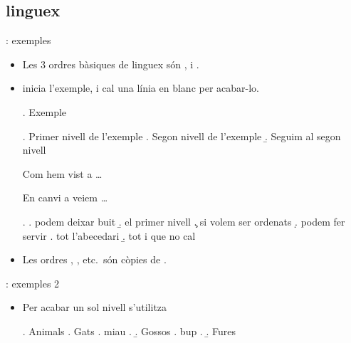 \subsection{linguex}
\begin{frame}[fragile]{\insertsubsection{}: exemples}
\begin{itemize}
\item Les 3 ordres bàsiques de linguex són ,  i . 
\item {} inicia l'exemple, i cal una línia en blanc per acabar-lo.
\begin{exampletwouptiny2}
\ex. Exemple

\ex. Primer nivell de l'exemple
\a. Segon nivell de l'exemple
\b. Seguim al segon nivell 

Com hem vist a \Last \dots

En canvi a \Next veiem \dots

\ex. 
\a. podem deixar buit 
\b. el primer nivell
\c. si volem ser ordenats
\d. podem fer servir
\e. tot l'abecedari
\b. tot i que no cal

\end{exampletwouptiny2}
\item Les ordres , , etc.~són còpies de .
\end{itemize}
\end{frame}

\begin{frame}[fragile]{\insertsubsection{}: exemples 2}
\begin{itemize}
\item Per acabar un sol nivell s'utilitza  
\begin{exampletwouptiny2}
\ex. Animals 
\a. Gats
\a. miau
\z.
\b. Gossos
\a. bup
\z.
\b. Fures

\end{exampletwouptiny2}
\end{itemize}

\end{frame}

